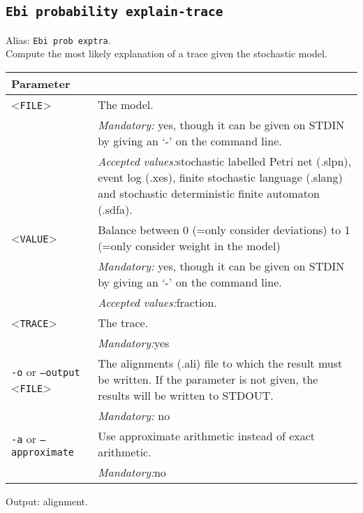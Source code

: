 {\subsection{\texttt{Ebi probability explain-trace}}
\label{command:Ebi probability explain-trace}
Alias: \texttt{Ebi prob exptra}.\\
Compute the most likely explanation of a trace given the stochastic model.\\
\begin{tabularx}{\linewidth}{lX}
\toprule
Parameter \\\midrule
<\texttt{FILE}>&The model.\\
&\textit{Mandatory:} \quad yes, though it can be given on STDIN by giving an `-' on the command line.\\
&\textit{Accepted values:}\quad stochastic labelled Petri net (.slpn), event log (.xes), finite stochastic language (.slang) and stochastic deterministic finite automaton (.sdfa).\\
<\texttt{VALUE}>&Balance between 0 (=only consider deviations) to 1 (=only consider weight in the model)\\
&\textit{Mandatory:} \quad yes, though it can be given on STDIN by giving an `-' on the command line.\\
&\textit{Accepted values:}\quad fraction.\\
<\texttt{TRACE}>
&The trace.\\
&\textit{Mandatory:}\quad yes\\
\texttt{-o} or \texttt{--output} <\texttt{FILE}> &
The alignments (.ali) file to which the result must be written. If the parameter is not given, the results will be written to STDOUT.\\
&\textit{Mandatory:} \quad no\\
\texttt{-a} or \texttt{--approximate} & Use approximate arithmetic instead of exact arithmetic.\\
&\textit{Mandatory:}\quad no\\
\bottomrule
\end{tabularx}
Output: alignment.
}
